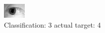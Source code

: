 \begin{figure}[h!]
\begin{center}
\includegraphics[width=0.60\columnwidth]{figures/ID1217_class_3_target_4.png}
\end{center}
\caption{ Classification: 3 actual target: 4}
\label{fig:ID1217_class_3_target_4}
\end{figure}
